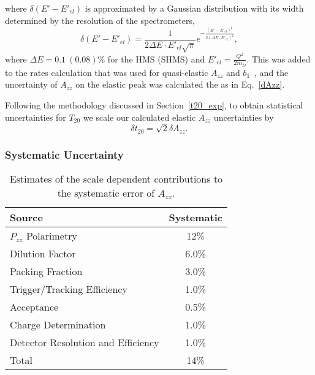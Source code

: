 where $\delta(E'-E'_{el})$ is approximated by a Gaussian distribution with its width determined by the resolution of the spectrometers, 
\begin{equation}
\delta(E'-E'_{el}) = \frac{1}{2\Delta E\cdot E'_{el}\sqrt{\pi}}e^{-\frac{(E'-E'_{el})^2}{2(\Delta E\cdot E'_{el})^2}}, 
\end{equation}
where $\Delta E=0.1 ~(0.08)\%$ for the HMS (SHMS) and $E'_{el}=\frac{Q^2}{2m_D}.$ This was added to the rates calculation that was used for quasi-elastic $A_{zz}$ and $b_1$~\cite{Long:2013tn}, and the uncertainty of $A_{zz}$ on the elastic peak was calculated the as in Eq.~\ref{dAzz}.

Following the methodology discussed in Section~\ref{t20_exp}, to obtain statistical uncertainties for $T_{20}$ we scale our calculated elastic $A_{zz}$ uncertainties by
\begin{equation}
\delta t_{20} = \sqrt{2}\delta A_{zz}.
\end{equation}






\iffalse
\subsubsection{Systematic Uncertainty}%
\begin{table}
\begin{center}
\begin{tabular}{l|c}\hline\hline
Source								& Systematic \\
\hline
$P_{zz}$ Polarimetry					& 12\%   \\
Dilution Factor						& 6.0\%   \\
Packing Fraction						& 3.0\%   \\
Trigger/Tracking Efficiency			& 1.0\% \\
Acceptance							& 0.5\% \\
Charge Determination					& 1.0\%  \\
Detector Resolution and Efficiency	& 1.0\% \\
\hline
Total								& 14\%   \\
\hline
\end{tabular}
\caption{\label{error1}Estimates of the scale dependent contributions to the systematic error of $A_{zz}$.}
\end{center}
\end{table}

